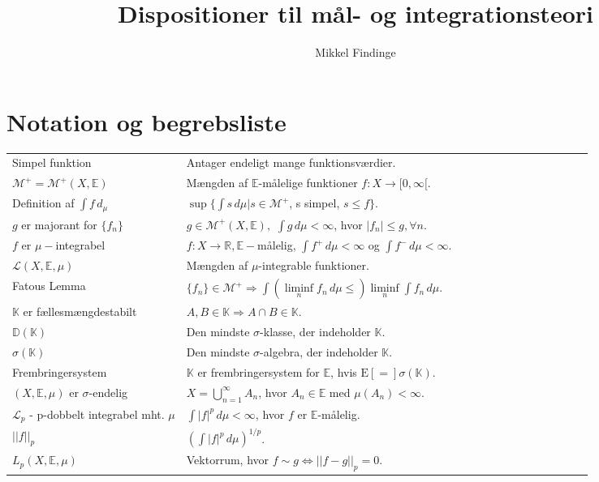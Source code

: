 \documentclass[12pt]{report}
\title{Dispositioner til mål- og integrationsteori}
\author{Mikkel Findinge}
\theoremstyle{break}
\theoremstyle{break}
\newcommand{\E}[1]{\mathrm{E}\left[#1\right]}
\newcommand{\Int}[1]{\int#1\,d\mu}
\newcommand{\RR}{\mathbb{R}}
\newcommand{\EE}{\mathbb{E}}
\newcommand{\M}{\mathcal{M}^+}
\renewcommand{\L}{\mathcal{L}}
\newcommand{\K}{\mathbb{K}}
\newcommand{\D}{\mathbb{D}}
\newcommand{\laengde}[1]{\lvert|#1\rvert|}
\begin{document}
\maketitle
{}
\section*{Notation og begrebsliste}
\renewcommand{\arraystretch}{3}
\begin{tabular}{p{0.3\linewidth}p{0.7\linewidth}}
Simpel funktion & Antager endeligt mange funktionsværdier.
\\
$\M=\M(X,\EE)$ & Mængden af $\EE$-målelige funktioner $f\colon X\to[0,\infty[$.
\\
Definition af $\int f\, d_\mu$ & $\sup\{\int s\, d\mu| s\in\M$, s simpel, $s\leq f\}$.
\\
$g$ er majorant for $\{f_n\}$ & $g\in\M(X,\EE),$ $\int g\, d\mu<\infty$, hvor $\lvert f_n\rvert\leq g, \forall n$.
\\
$f$ er $\mu-$integrabel & $f\colon X\to\RR, \EE-$målelig, $\int f^+\, d\mu<\infty$ og $\int f^-\, d\mu<\infty$.
\\
$\L(X,\EE,\mu)$ & Mængden af $\mu$-integrable funktioner.
\\
Fatous Lemma & $\{f_n\}\in\M\Rightarrow\int\left(\liminf\limits_nf_n\, d\mu\leq\right)\liminf\limits_n\int f_n\, d\mu.$
\\
$\K$ er fællesmængdestabilt & $A,B\in\K\Rightarrow A\cap B\in\K$.
\\
$\D(\K)$ & Den mindste $\sigma$-klasse, der indeholder $\K$.
\\
$\sigma(\K)$ & Den mindste $\sigma$-algebra, der indeholder $\K$.
\\
Frembringersystem & $\K$ er frembringersystem for $\EE$, hvis $\E = \sigma(\K)$.
\\
$(X,\EE,\mu)$ er $\sigma$-endelig & $X = \bigcup_{n = 1}^\infty  {A_n}$, hvor $A_n\in\EE$ med $\mu(A_n)<\infty$.
\\
$\L_p$ - p-dobbelt integrabel mht. $\mu$ & $\Int{|f|^p}<\infty$, hvor $f$ er $\EE$-målelig.
\\
$\laengde{f}_p$ & $\left(\Int{|f|^p}\right)^{1/p}$.
\\
$L_p(X,\EE,\mu)$ & Vektorrum, hvor $f\sim g\Leftrightarrow\laengde{f-g}_p=0$.
\end{tabular}


\newpage
\addtocounter{chapter}{1}
\end{document}
